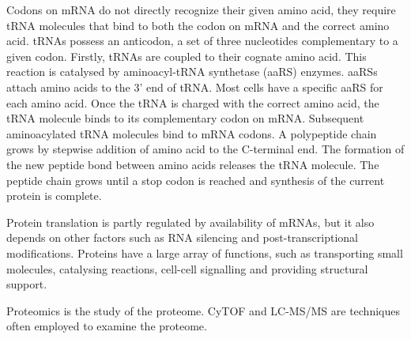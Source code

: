 Codons on mRNA do not directly recognize their given amino acid, they require tRNA molecules that bind to both the codon on mRNA and the correct amino acid.
tRNAs possess an anticodon, a set of three nucleotides complementary to a given codon.
Firstly, tRNAs are coupled to their cognate amino acid.
This reaction is catalysed by aminoacyl-tRNA synthetase (aaRS) enzymes.
aaRSs attach amino acids to the 3' end of tRNA.
Most cells have a specific aaRS for each amino acid.
Once the tRNA is charged with the correct amino acid, the tRNA molecule binds to its complementary codon on mRNA\@.
Subsequent aminoacylated tRNA molecules bind to mRNA codons.
A polypeptide chain grows by stepwise addition of amino acid to the C-terminal end.
The formation of the new peptide bond between amino acids releases the tRNA molecule.
The peptide chain grows until a stop codon is reached and synthesis of the current protein is complete.

Protein translation is partly regulated by availability of mRNAs, but it also depends on other factors such as RNA silencing and post-transcriptional modifications.
Proteins have a large array of functions, such as transporting small molecules, catalysing reactions, cell-cell signalling and providing structural support.

Proteomics is the study of the proteome.
CyTOF and LC-MS/MS are techniques often employed to examine the proteome. %

